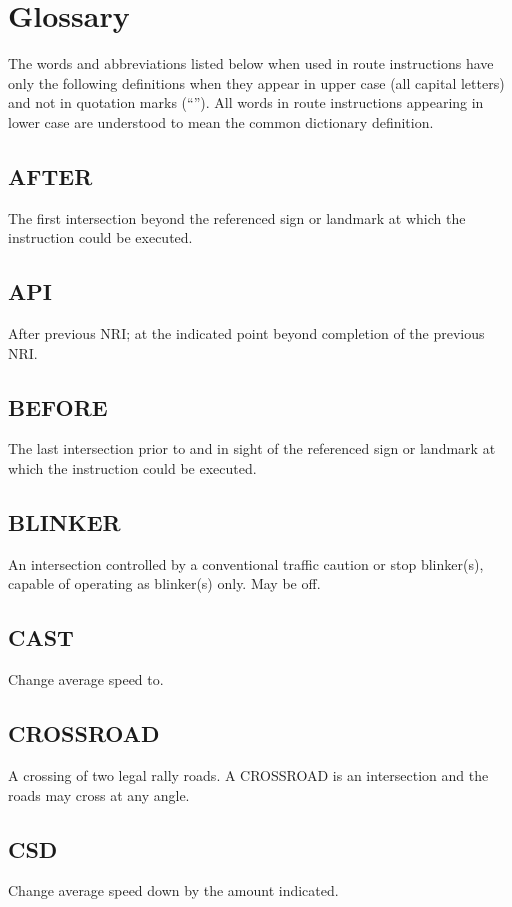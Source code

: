 \section{Glossary}
The words and abbreviations listed below when used in route instructions have only the following definitions when they appear in upper case (all capital letters) and not in quotation marks (``'').  All words in route instructions appearing in lower case are understood to mean the common dictionary definition.

\subsection{AFTER}
The first intersection beyond the referenced sign or landmark at which the instruction could be executed.

\subsection{API}
After previous NRI; at the indicated point beyond completion of the previous NRI.

\subsection{BEFORE}
The last intersection prior to and in sight of the referenced sign or landmark at which the instruction could be executed.

\subsection{BLINKER}
An intersection controlled by a conventional traffic caution or stop blinker(s), capable of operating as blinker(s) only.  May be off.

\subsection{CAST}
Change average speed to.

\subsection{CROSSROAD}
A crossing of two legal rally roads.  A CROSSROAD is an intersection and the roads may cross at any angle.

\subsection{CSD}
Change average speed down by the amount indicated.

